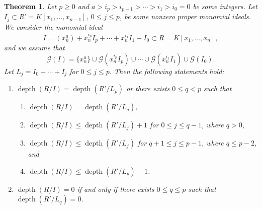 \documentclass[11pt]{amsart}
\newtheorem{theorem}{Theorem}[section]
\def\depth{\operatorname{depth}}
\begin{document}
\begin{theorem}\label{t1}
Let $p\geq 0$ and $a>i_p>i_{p-1}>\cdots>i_1>i_0=0$ be some integers. Let $I_j\subset R'=K[x_1,\ldots,x_{n-1}]$, $0\leq j\leq p$, be some nonzero 
proper monomial ideals. We consider the monomial ideal 
 $$I=(x_n^a)+x_n^{i_p}I_p + \cdots + x_n^{i_1}I_1 + I_0 \subset R=K[x_1,\ldots,x_n],$$ and we assume that
$$\mathcal{G}(I)=\{x_n^a\}\cup \mathcal{G}(x_n^{i_p}I_p) \cup \cdots \cup \mathcal{G}(x_n^{i_1}I_1) \cup \mathcal{G}(I_0).$$
Let $L_j=I_0+\cdots+I_j$  for $0\leq j\leq p$.  Then the following statements hold:

\begin{enumerate}
\item[(1)] $\depth(R/I)=\depth(R'/L_p)$ or there exists $0\leq q<p$ such that
           \begin{enumerate}
           \item $\depth(R/I)=\depth(R'/L_q)$,
           \item $\depth(R/I)\leq \depth(R'/L_j)+1$  for $0\leq j\leq q-1$, where $q>0$, 
					 \item $\depth(R/I)\leq \depth(R'/L_j)$  for $q+1\leq j\leq p-1$, where $q\leq p-2$,  and
					 \item $\depth(R/I)\leq \depth(R'/L_p)-1$.
					 \end{enumerate}
\item[(2)] $\depth(R/I)=0$ if and only if there exists $0\leq q\leq p$ such that $\depth(R'/L_q)=0$.

\end{enumerate}
\end{theorem}
\end{document}
